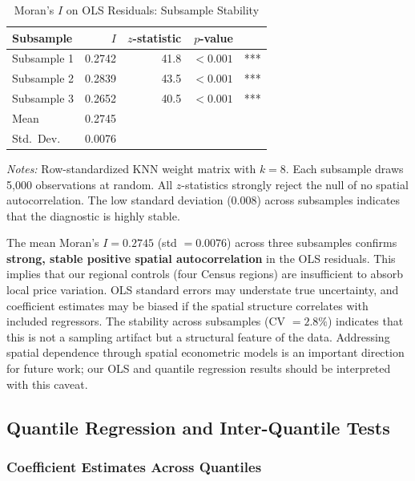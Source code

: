 \begin{table}[H]
\centering
\caption{Moran's $I$ on OLS Residuals: Subsample Stability}
\label{tab:moran}
\begin{threeparttable}
\begin{tabular}{lrrrl}
\toprule
Subsample & $I$ & $z$-statistic & $p$-value & \\
\midrule
Subsample 1 & 0.2742 & 41.8 & $<0.001$ & *** \\
Subsample 2 & 0.2839 & 43.5 & $<0.001$ & *** \\
Subsample 3 & 0.2652 & 40.5 & $<0.001$ & *** \\
\midrule
Mean & 0.2745 & & & \\
Std.\ Dev. & 0.0076 & & & \\
\bottomrule
\end{tabular}
\begin{tablenotes}
\small
\item \textit{Notes:} Row-standardized KNN weight matrix with $k = 8$. Each subsample draws 5,000 observations at random. All $z$-statistics strongly reject the null of no spatial autocorrelation. The low standard deviation (0.008) across subsamples indicates that the diagnostic is highly stable.
\end{tablenotes}
\end{threeparttable}
\end{table}

The mean Moran's $I = 0.2745$ (std $= 0.0076$) across three subsamples confirms \textbf{strong, stable positive spatial autocorrelation} in the OLS residuals. This implies that our regional controls (four Census regions) are insufficient to absorb local price variation. OLS standard errors may understate true uncertainty, and coefficient estimates may be biased if the spatial structure correlates with included regressors. The stability across subsamples (CV $= 2.8\%$) indicates that this is not a sampling artifact but a structural feature of the data. Addressing spatial dependence through spatial econometric models is an important direction for future work; our OLS and quantile regression results should be interpreted with this caveat.


\subsection{Quantile Regression and Inter-Quantile Tests}
\label{sec:qr_results}

\subsubsection{Coefficient Estimates Across Quantiles}

